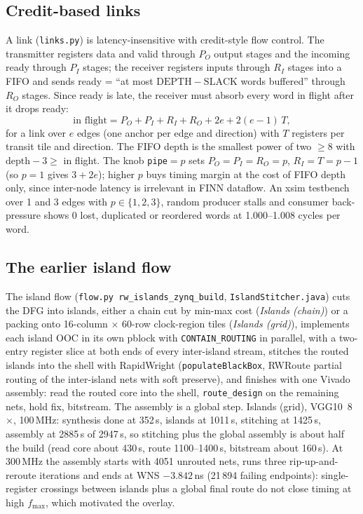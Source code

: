 \documentclass[10pt,twocolumn]{article}
\newcommand{\code}[1]{\texttt{\small #1}}
\begin{document}
\subsection{Credit-based links}
\label{sec:links}
A link (\code{links.py}) is latency-insensitive with credit-style flow control. The transmitter
registers data and valid through $P_O$ output stages and the incoming ready through $P_I$
stages; the receiver registers inputs through $R_I$ stages into a FIFO and sends ready = ``at most
$\mathrm{DEPTH}-\mathrm{SLACK}$ words buffered'' through $R_O$ stages. Since ready is late, the
receiver must absorb every word in flight after it drops ready:
\[
\text{in flight} = P_O{+}P_I{+}R_I{+}R_O + 2e + 2(e{-}1)\,T ,
\]
for a link over $e$ edges (one anchor per edge and direction) with $T$ registers per transit
tile and direction. The FIFO depth is the smallest power of two $\ge 8$ with
$\mathrm{depth}-3 \ge$ in flight. The knob \code{pipe}$=p$ sets $P_O{=}P_I{=}R_O{=}p$,
$R_I{=}T{=}p{-}1$ (so $p{=}1$ gives $3+2e$); higher $p$ buys timing margin at the cost of FIFO depth
only, since inter-node latency is irrelevant in FINN dataflow. An xsim testbench over 1 and 3
edges with $p\in\{1,2,3\}$, random producer stalls and consumer back-pressure shows 0
lost, duplicated or reordered words at 1.000--1.008 cycles per word.

\subsection{The earlier island flow}
\label{sec:islands}
The island flow (\code{flow.py rw\_islands\_zynq\_build}, \code{IslandStitcher.java}) cuts the
DFG into islands, either a chain cut by min-max cost (\emph{Islands (chain)}) or a packing onto
16-column $\times$ 60-row clock-region tiles (\emph{Islands (grid)}), implements each island OOC
in its own pblock with \code{CONTAIN\_ROUTING} in parallel, with a two-entry register slice at
both ends of every inter-island stream, stitches the routed islands into the shell with
RapidWright (\code{populateBlackBox}, RWRoute partial routing of the inter-island nets with soft
preserve), and finishes with one Vivado assembly: read the routed core into the shell,
\code{route\_design} on the remaining nets, hold fix, bitstream. The assembly is a global step.
Islands (grid), VGG10~8$\times$, 100\,MHz: synthesis done at 352\,s, islands at 1011\,s,
stitching at 1425\,s, assembly at 2885\,s of 2947\,s, so stitching plus the global assembly is
about half the build (read core about 430\,s, route 1100--1400\,s, bitstream about 160\,s). At
300\,MHz the assembly starts with 4051 unrouted nets, runs three rip-up-and-reroute iterations
and ends at WNS $-3.842$\,ns (21\,894 failing endpoints): single-register crossings between
islands plus a global final route do not close timing at high $f_{\max}$, which motivated the
overlay.
\end{document}
